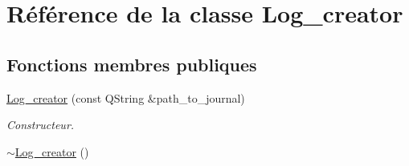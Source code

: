 \hypertarget{classLog__creator}{
\section{Référence de la classe Log\_\-creator}
\label{classLog__creator}
}
\subsection*{Fonctions membres publiques}
\begin{DoxyCompactItemize}
\item 
\hyperlink{classLog__creator_a9b41865df79c41c8924597575919eb10}{Log\_\-creator} (const QString \&path\_\-to\_\-journal)
\begin{DoxyCompactList}\small\item\em Constructeur. \item\end{DoxyCompactList}\item 
\hypertarget{classLog__creator_af63167b0de7f559c4c67430662ae2b45}{
\hyperlink{classLog__creator_af63167b0de7f559c4c67430662ae2b45}{$\sim$Log\_\-creator} ()}
\label{classLog__creator_af63167b0de7f559c4c67430662ae2b45}


\end{DoxyCompactItemize}
